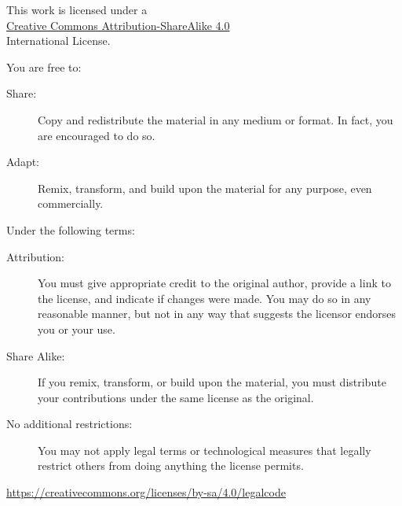 \documentclass[a4paper]{article}
\begin{document}
\linenumbers
\renewcommand{\thepage}{\roman{page}}
\setcounter{page}{0}

\begin{titlepage}
\titleDB
\end{titlepage}



\begin{center}
This work is licensed under a \\
\href{http://creativecommons.org/licenses/by-sa/4.0/}{Creative Commons Attribution-ShareAlike 4.0}\\
International License.
\end{center}


\begin{center}
You are free to:
\end{center}

\begin{description}
  \item[Share:] Copy and redistribute the material in any medium or format. In fact, you are encouraged to do so.
  \item[Adapt:] Remix, transform, and build upon the material
for any purpose, even commercially.
\end{description}

\begin{center}
Under the following terms:
\end{center}

\begin{description}
\item[Attribution:] You must give appropriate credit to the original author, provide a link to the license, and indicate if changes were made. You may do so in any reasonable manner, but not in any way that suggests the licensor endorses you or your use.

\item[Share Alike:] If you remix, transform, or build upon the material, you must distribute your contributions under the same license as the original.
\item[No additional restrictions:] You may not apply legal terms or technological measures that legally restrict others from doing anything the license permits.
\end{description}

\begin{center}
\url{https://creativecommons.org/licenses/by-sa/4.0/legalcode}
\end{center}
\end{document}
